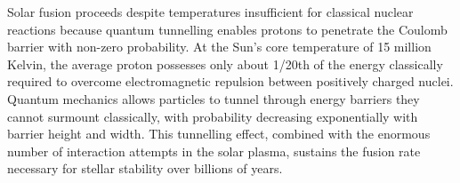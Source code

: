Solar fusion proceeds despite temperatures insufficient for classical nuclear reactions because quantum tunnelling enables protons to penetrate the Coulomb barrier with non-zero probability. At the Sun's core temperature of 15 million Kelvin, the average proton possesses only about 1/20th of the energy classically required to overcome electromagnetic repulsion between positively charged nuclei. Quantum mechanics allows particles to \QSOpen{}tunnel\QSClose{} through energy barriers they cannot surmount classically, with probability decreasing exponentially with barrier height and width. This tunnelling effect, combined with the enormous number of interaction attempts in the solar plasma, sustains the fusion rate necessary for stellar stability over billions of years.